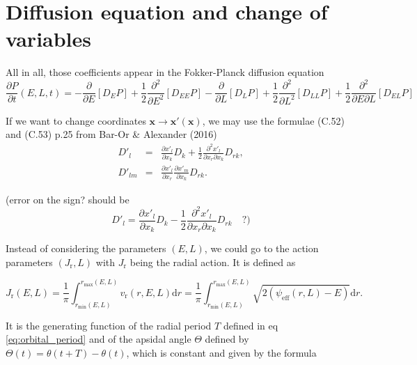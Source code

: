 \documentclass[11pt]{article}
\newcommand{\rr}{\mathrm{r}}
\newcommand{\vr}{v_{\rr}}
\newcommand{\rd}{{\mathrm{d}}}
\newcommand{\dE}{D_{E}}
\newcommand{\dL}{D_{L}}
\newcommand{\dEE}{D_{EE}}
\newcommand{\dLL}{D_{LL}}
\newcommand{\dEL}{D_{EL}}
\newcommand{\rmax}{r_{\max}}
\newcommand{\rmin}{r_{\min}}
\newcommand{\psieff}{\psi_{\mathrm{eff}}}
\newcommand{\bx}{\boldsymbol{x}}
\newcommand{\xp}{x'}
\newcommand{\bxp}{\boldsymbol{\xp}}
\newcommand{\Jr}{J_{\mathrm{r}}}
\begin{document}
\section{Diffusion equation and change of variables}
\label{sec:diffEq_changeVar}

All in all, those coefficients appear in the Fokker-Planck diffusion
equation
\begin{equation}
\frac{\partial P}{\partial t}(E,L,t)=-\frac{\partial}{\partial E}\left[\dE P\right]+\frac{1}{2}\frac{\partial^{2}}{\partial E^{2}}\left[\dEE P\right]-\frac{\partial}{\partial L}\left[\dL P\right]+\frac{1}{2}\frac{\partial^{2}}{\partial L^{2}}\left[\dLL P\right]+\frac{1}{2}\frac{\partial^{2}}{\partial E\partial L}\left[\dEL P\right]
\label{eq:FP:equation}
\end{equation}

If we want to change coordinates $\bx\rightarrow\bxp(\bx)$,
we may use the formulae (C.52) and (C.53) p.25 from Bar-Or \& Alexander
(2016)
\begin{equation}
\begin{array}{ccl}
  D'_{l} & =& \displaystyle{\frac{\partial \xp_{l}}{\partial x_{k}}D_{k}+\frac{1}{2}\frac{\partial^{2}\xp_{l}}{\partial x_{r}\partial x_{k}}D_{rk}} ,\\
  
 D'_{lm} & =&\displaystyle{\frac{\partial \xp_{l}}{\partial x_{r}}\frac{\partial \xp_{m}}{\partial x_{k}}D_{rk}} .
\end{array}
\label{eq:change_var_DiffCoeffs}
\end{equation}


(error on the sign? should be
\[
D'_{l}=\frac{\partial \xp_{l}}{\partial x_{k}}D_{k}-\frac{1}{2}\frac{\partial^{2}\xp_{l}}{\partial x_{r}\partial x_{k}}D_{rk}\quad?)
\]

Instead of considering the parameters $(E,L)$, we could go to the action parameters $(\Jr,L)$ with $\Jr$ being the radial action. It is defined as

\begin{equation}
  \Jr(E,L) = \frac{1}{\pi} \int_{\rmin(E,L)}^{\rmax(E,L)}\vr(r,E,L)\rd r =  \frac{1}{\pi} \int_{\rmin(E,L)}^{\rmax(E,L)} \sqrt{2(\psieff(r,L)-E)}\rd r.
  \label{eq:Radial_action}
  \end{equation}

It is the generating function of the radial period $T$ defined in eq \eqref{eq:orbital_period} and of the apsidal angle $\Theta$ defined by  $\Theta(t)=\theta(t+T)-\theta(t)$, which is constant and given by the formula
\end{document}
